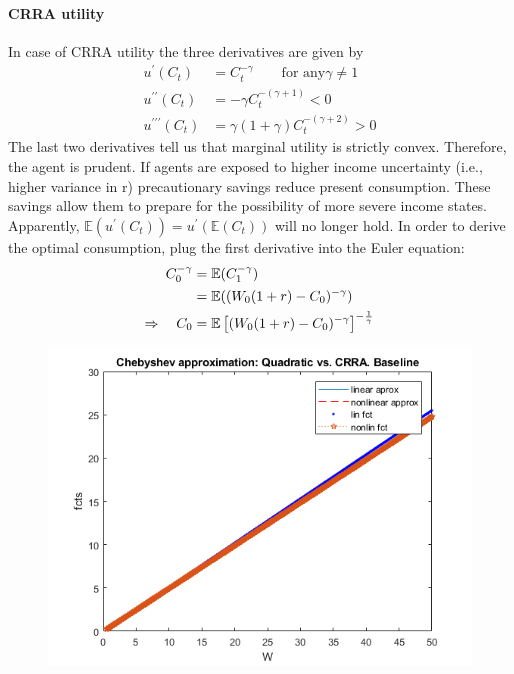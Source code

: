 \documentclass{article}
\begin{document}
\paragraph{CRRA utility}
In case of CRRA utility the three derivatives are given by
\begin{align*}
u^\prime(C_t) &= C_t^{-\gamma} \quad \quad \text{for any} \gamma \neq 1 \tag{Marginal utility}\\
u^{\prime\prime}(C_t) &= -\gamma C_t^{-(\gamma+1)} < 0 \tag{Risk aversion}\\
u^{\prime\prime\prime}(C_t) &= \gamma (1 + \gamma) C_t^{-(\gamma+2)} > 0 \tag{Prudence}
\end{align*}
The last two derivatives tell us that marginal utility is strictly convex. Therefore, the agent is prudent. If agents are exposed to higher income uncertainty (i.e., higher variance in r) precautionary savings reduce present consumption. These savings allow them to prepare for the possibility of more severe income states.\\

Apparently, $\mathbb{E}(u^\prime(C_t)) = u^\prime(\mathbb{E}(C_t))$ will no longer hold. In order to derive the optimal consumption, plug the first derivative into the Euler equation:
\begin{align*}
C_0^{-\gamma} &= \mathbb{E}(C_1^{-\gamma}) \notag \\
&= \mathbb{E}((W_0 (1+r) - C_0)^{-\gamma}) \notag \\
\Rightarrow \quad C_0 &= \mathbb{E}\left[(W_0 (1+r) - C_0)^{-\gamma}\right]^{-\frac{1}{\gamma}}
\end{align*}



\begin{figure}[h!] \begin{center}
\includegraphics[width = .8\textwidth, keepaspectratio]{ps4ex2fig1.png}
\end{center}
\end{figure}
\end{document}
